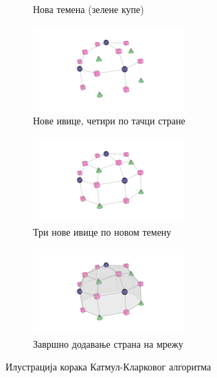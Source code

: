 \documentclass[12pt]{article}
\begin{document}
\begin{figure}[H]
\begin{subfigure}{0.3\linewidth}
			\caption{Нова темена (зелене купе)}
		\end{subfigure}
		\begin{subfigure}{0.3\linewidth}
			\includegraphics[width=\linewidth]{slike/Catmull-Clark_Recursive_Step_4.png}
			\caption{Нове ивице, четири по тачци стране}
		\end{subfigure}
		\begin{subfigure}{0.3\linewidth}
			\includegraphics[width=\linewidth]{slike/Catmull-Clark_Recursive_Step_5.png}
			\caption{Три нове ивице по новом темену}
		\end{subfigure}
		\begin{subfigure}{0.3\linewidth}
			\includegraphics[width=\linewidth]{slike/Catmull-Clark_Recursive_Step_6.png}
			\caption{Завршно додавање страна на мрежу}
		\end{subfigure}
		\caption{Илустрација корака Катмул-Кларковог алгоритма}
		\label{fig:katmulklark}
	\end{figure}
	
	\tableofcontents
	
\end{document}
